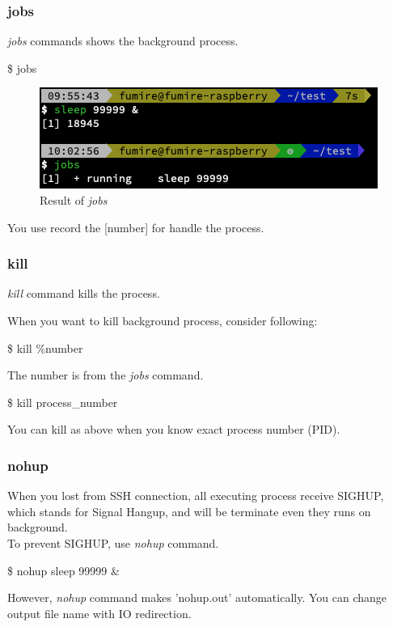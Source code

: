 \documentclass{beamer}
\begin{document}
	\begin{frame}
		\frametitle{jobs}
		\textit{jobs} commands shows the background process.
		\begin{example}
			\$ jobs
		\end{example}
	
		\begin{figure}[h!]
			\centering
			\includegraphics[width=0.5 \linewidth]{figures/12.png}
			\caption{Result of \textit{jobs}}
		\end{figure}
		You use record the [number] for handle the process. \\
	\end{frame}

	\begin{frame}
		\frametitle{kill}
		\textit{kill} command kills the process. 
		
		When you want to kill background process, consider following:
		\begin{example}
			\$ kill \%number
		\end{example}
		The number is from the \textit{jobs} command. 
		
		\begin{example}
			\$ kill process\_number
		\end{example}
		You can kill as above when you know exact process number (PID). 
	\end{frame}

	\begin{frame}
		\frametitle{nohup}
		When you lost from SSH connection, all executing process receive SIGHUP, which stands for Signal Hangup, and will be terminate even they runs on background. \\
		To prevent SIGHUP, use \textit{nohup} command. 
		
		\begin{example}
			\$ nohup sleep 99999 \&
		\end{example}
	
		However, \textit{nohup} command makes 'nohup.out' automatically. You can change output file name with IO redirection. 
	\end{frame}
\end{document}
